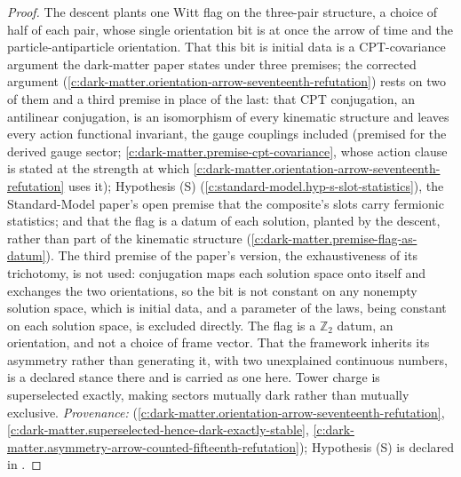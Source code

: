 \documentclass[11pt]{article}
\theoremstyle{definition}
\theoremstyle{plain}
\begin{document}
\begin{proof}
The descent plants one Witt flag on the three-pair structure, a choice of half of each pair, whose single orientation bit is at once the arrow of time and the particle-antiparticle orientation. That this bit is initial data is a CPT-covariance argument the dark-matter paper states under three premises; the corrected argument (\ref{c:dark-matter.orientation-arrow-seventeenth-refutation}) rests on two of them and a third premise in place of the last: that CPT conjugation, an antilinear conjugation, is an isomorphism of every kinematic structure and leaves every action functional invariant, the gauge couplings included (premised for the derived gauge sector; \ref{c:dark-matter.premise-cpt-covariance}, whose action clause is stated at the strength at which \ref{c:dark-matter.orientation-arrow-seventeenth-refutation} uses it); Hypothesis (S) (\ref{c:standard-model.hyp-s-slot-statistics}), the Standard-Model paper's open premise that the composite's slots carry fermionic statistics; and that the flag is a datum of each solution, planted by the descent, rather than part of the kinematic structure (\ref{c:dark-matter.premise-flag-as-datum}). The third premise of the paper's version, the exhaustiveness of its trichotomy, is not used: conjugation maps each solution space onto itself and exchanges the two orientations, so the bit is not constant on any nonempty solution space, which is initial data, and a parameter of the laws, being constant on each solution space, is excluded directly. The flag is a $\mathbb{Z}_{2}$ datum, an orientation, and not a choice of frame vector. That the framework inherits its asymmetry rather than generating it, with two unexplained continuous numbers, is a declared stance there and is carried as one here. Tower charge is superselected exactly, making sectors mutually dark rather than mutually exclusive. \emph{Provenance:} \cite[Def.~2.10, Prop.~4.1, Prop.~5.1 (stance), Prop.~5.2 (stated under three premises; the corrected argument replaces the exhaustiveness premise by the flag as a datum)]{ButlerT14} (\ref{c:dark-matter.orientation-arrow-seventeenth-refutation}, \ref{c:dark-matter.superselected-hence-dark-exactly-stable}, \ref{c:dark-matter.asymmetry-arrow-counted-fifteenth-refutation}); Hypothesis (S) is declared in \cite[\S5]{ButlerT12}.

\end{proof}
\end{document}
